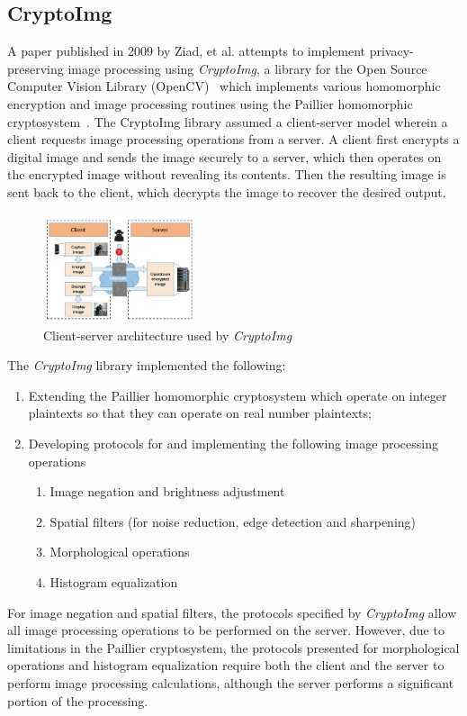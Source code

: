 \subsection{CryptoImg}
A paper published in 2009 by Ziad, et al. attempts to implement privacy-preserving image processing using \textit{CryptoImg}, a library for the Open Source Computer Vision Library (OpenCV)~\cite{bradski_opencv_2000} which implements various homomorphic encryption and image processing routines using the Paillier homomorphic cryptosystem~\cite{ziad_cryptoimg:_2016}. The CryptoImg library assumed a client-server model wherein a client requests image processing operations from a server. A client first encrypts a digital image and sends the image securely to a server, which then operates on the encrypted image without revealing its contents. Then the resulting image is sent back to the client, which decrypts the image to recover the desired output.
\begin{figure}[!ht]
    \centering
    \includegraphics[width=0.4\textwidth]{figures/ClientServerModel.png}
    \caption{Client-server architecture used by \textit{CryptoImg} \cite{ziad_cryptoimg:_2016}}
    \label{fig:clientserver}
\end{figure}

The \textit{CryptoImg} library implemented the following:
\begin{enumerate}
	\item Extending the Paillier homomorphic cryptosystem which operate on integer plaintexts so that they can operate on real number plaintexts;
	\item Developing protocols for and implementing the following image processing operations
	\begin{enumerate}
		\item Image negation and brightness adjustment
		\item Spatial filters (for noise reduction, edge detection and sharpening)
		\item Morphological operations
		\item Histogram equalization
	\end{enumerate}
\end{enumerate}
For image negation and spatial filters, the protocols specified by \textit{CryptoImg} allow all image processing operations to be performed on the server. However, due to limitations in the Paillier cryptosystem, the protocols presented for morphological operations and histogram equalization require both the client and the server to perform image processing calculations, although the server performs a significant portion of the processing.

